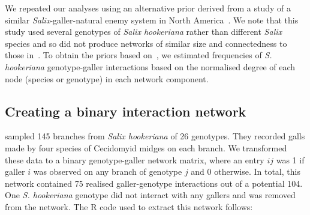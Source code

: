 \documentclass[12pt]{article}
\begin{document}
  We repeated our analyses using an alternative prior derived from a study of a similar \emph{Salix}-galler-natural enemy system in North America~\citep{Barbour2016,Barbour2016Dryad}. We note that this study used several genotypes of \emph{Salix hookeriana} rather than different \emph{Salix} species and so did not produce networks of similar size and connectedness to those in~\citep{Kopelke2017}.  To obtain the priors based on~\citet{Barbour2016}, we estimated frequencies of \emph{S. hookeriana} genotype-galler interactions based on the normalised degree of each node (species or genotype) in each network component.

    \subsection*{Creating a binary interaction network}

      \citet{Barbour2016,Barbour2016Dryad} sampled 145 branches from 
      \emph{Salix hookeriana} of 26 genotypes. They recorded galls 
      made by four species of Cecidomyid midges on each branch. We 
      transformed these data to a binary genotype-galler network 
      matrix, where an entry $ij$ was 1 if galler $i$ was observed 
      on any branch of genotype $j$ and 0 otherwise. In total, this 
      network contained 75 realised galler-genotype interactions 
      out of a potential 104. One \emph{S. hookeriana} genotype did
      not interact with any gallers and was removed from the network.
      The R code used to extract this 
      network follows:
\end{document}
